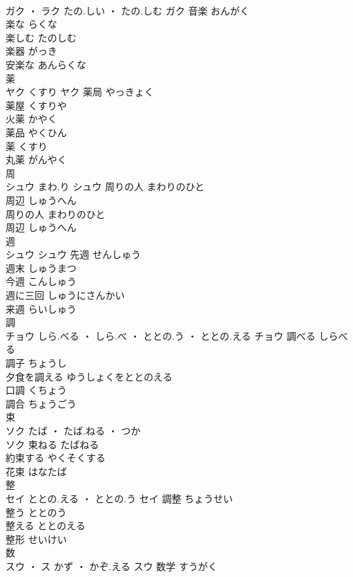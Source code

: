 \documentclass[8pt]{extreport}
\begin{document}
\begin{CJK}{UTF8}{min}
\\	ガク ・ ラク	たの.しい ・ たの.しむ	ガク	音楽	おんがく	
\\	楽な	らくな	
\\	楽しむ	たのしむ	
\\	楽器	がっき	
\\	安楽な	あんらくな	
\\	薬	
\\	ヤク	くすり	ヤク	薬局	やっきょく	
\\	薬屋	くすりや	
\\	火薬	かやく	
\\	薬品	やくひん	
\\	薬	くすり	
\\	丸薬	がんやく	
\\	周	
\\	シュウ	まわ.り	シュウ	周りの人	まわりのひと	
\\	周辺	しゅうへん	
\\	周りの人	まわりのひと	
\\	周辺	しゅうへん	
\\	週	
\\	シュウ		シュウ	先週	せんしゅう	
\\	週末	しゅうまつ	
\\	今週	こんしゅう	
\\	週に三回	しゅうにさんかい	
\\	来週	らいしゅう	
\\	調	
\\	チョウ	しら.べる ・ しら.べ ・ ととの.う ・ ととの.える	チョウ	調べる	しらべる	
\\	調子	ちょうし	
\\	夕食を調える	ゆうしょくをととのえる	
\\	口調	くちょう	
\\	調合	ちょうごう	
\\	束	
\\	ソク	たば ・ たば.ねる ・ つか
\\	ソク	束ねる	たばねる	
\\	約束する	やくそくする	
\\	花束	はなたば	
\\	整	
\\	セイ	ととの.える ・ ととの.う	セイ	調整	ちょうせい	
\\	整う	ととのう	
\\	整える	ととのえる	
\\	整形	せいけい	
\\	数	
\\	スウ ・ ス	かず ・ かぞ.える	スウ	数学	すうがく	

\end{CJK}
\end{document}
